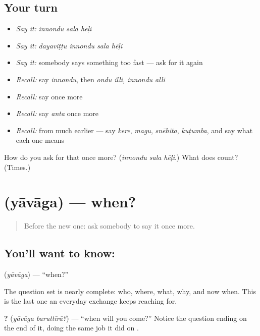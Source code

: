 \subsection*{Your turn}
\begin{itemize}
\raggedright
  \item \emph{Say it:} \emph{innondu sala hēḷi}
  \item \emph{Say it:} \emph{dayaviṭṭu innondu sala hēḷi}
  \item \emph{Say it:} somebody says something too fast — ask for it again
  \item \emph{Recall:} say \emph{innondu}, then \emph{ondu illi, innondu alli}
  \item \emph{Recall:} say \emph{} once more
  \item \emph{Recall:} say \emph{anta} once more
  \item \emph{Recall:} from much earlier — say \emph{kere}, \emph{magu}, \emph{snēhita}, \emph{kuṭumba}, and say what each one means
\end{itemize}

\begin{tcolorbox}[breakable,colback=teal!4,colframe=teal!35!black,title={Before you move on}]
How do you ask for that once more? (\emph{innondu sala hēḷi}.) What does  count? (Times.)
\end{tcolorbox}
\section[\texorpdfstring{\kn{ಯಾವಾಗ} (yāvāga)}{ಯಾವಾಗ (yāvāga)}]{ (yāvāga) — when?}

\label{lesson:KA-C71-when}



\begin{quote}
Before the new one: ask somebody to say it once more.
\end{quote}

\subsection*{You'll want to know: }
\textbf{} (\emph{yāvāga}) — \textquotedblleft{}when?\textquotedblright{}

The question set is nearly complete: who, where, what, why, and now when. This is the last one an everyday exchange keeps reaching for.

\textbf{ ?} (\emph{yāvāga baruttīrā?}) — \textquotedblleft{}when will you come?\textquotedblright{} Notice the question ending on the end of it, doing the same job it did on .

